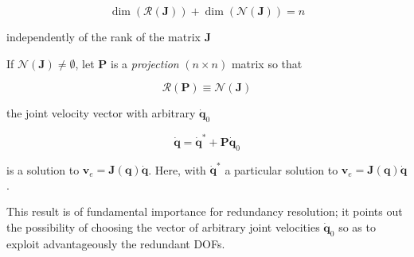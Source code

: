 \documentclass[10pt]{article}
\begin{document}
$$
\operatorname{dim}(\mathcal{R}(\boldsymbol{J}))+\operatorname{dim}(\mathcal{N}(\boldsymbol{J}))=n
$$

independently of the rank of the matrix $\boldsymbol{J}$

If $\mathcal{N}(\boldsymbol{J}) \neq \emptyset$, let $\boldsymbol{P}$ is a \emph{projection} $(n \times n)$ matrix so that

$$
\mathcal{R}(\boldsymbol{P}) \equiv \mathcal{N}(\boldsymbol{J})
$$

the joint velocity vector with arbitrary $\dot{\boldsymbol{q}}_{0}$

$$
\dot{\boldsymbol{q}}=\dot{\boldsymbol{q}}^{*}+\boldsymbol{P} \dot{\boldsymbol{q}}_{0}$$

is a solution to  $\boldsymbol{v}_{e}=\boldsymbol{J}(\boldsymbol{q}) \dot{\boldsymbol{q}}$. Here,
with $\dot{\boldsymbol{q}}^*$ a particular solution to $\boldsymbol{v}_{e}=\boldsymbol{J}(\boldsymbol{q}) \dot{\boldsymbol{q}}$. 

This result is of fundamental importance for redundancy resolution; it points out the possibility of choosing the vector of arbitrary joint velocities $\dot{\boldsymbol{q}}_{0}$ so as to exploit advantageously the redundant DOFs. 
\end{document}
